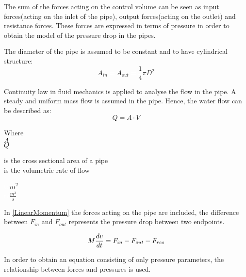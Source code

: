 The sum of the forces acting on the control volume can be seen as input forces(acting on the inlet of the pipe), output forces(acting on the outlet) and resistance forces.  
These forces are expressed in terms of pressure in order to obtain the model of the pressure drop in the pipes. 

The diameter of the pipe is assumed to be constant and to have cylindrical structure:
\begin{equation}
  A_{in} = A_{out} = \frac{1}{4}\pi D^{2}
\end{equation}

Continuity law in fluid mechanics is applied to analyse the flow in the pipe. \cite{Hunt_Fluidmechanics} A steady and uniform mass flow is assumed in the pipe. Hence, the water flow can be described as: 
\begin{equation}
  Q=A \cdot V
	\label{EquationOfContinuity}
\end{equation}

 \begin{minipage}[t]{0.20\textwidth}
Where\\
\hspace*{8mm} $A$ \\
\hspace*{8mm} $Q$ 
\end{minipage}
\begin{minipage}[t]{0.68\textwidth}
\vspace*{2mm}
is the cross sectional area of a pipe\\
is the volumetric rate of flow

\end{minipage}
\begin{minipage}[t]{0.10\textwidth}
\vspace*{2mm}
\textcolor{White}{te}$\unit{m^{2}}$\\
\textcolor{White}{te}$\unit{\frac{m^{3}}{s}}$
\end{minipage}

 In \eqref{LinearMomentum} the forces acting on the pipe are included, the difference between $F_{in}$ and $F_{out}$ represents the pressure drop 
 between two endpoints.

\begin{equation}
  M \frac{dv}{dt} = F_{in} - F_{out} - F_{res} \\
  \label{LinearMomentum}
\end{equation}

In order to obtain an equation consisting of only pressure parameters, the relationship between forces and pressures is used.


